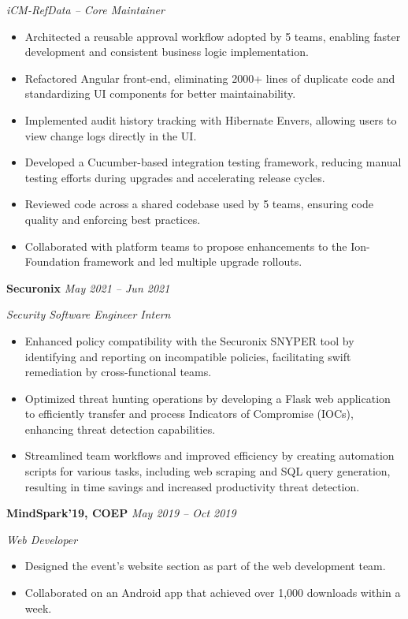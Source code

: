 \documentclass[a4paper,10pt]{article}
\newcommand{\cvHeaderTwo}[2]{%
  \vspace{0.8em}%
  \noindent\textbf{\normalsize #1} \hfill \textit{#2}\par%
}
\newcommand{\cvHeaderThree}[1]{%
  \noindent\textit{#1}%
}
\newenvironment{cvItemList}{%
  \begin{itemize}%
    \setlength{\itemsep}{0.1em}%
    \setlength{\topsep}{0em}%
    \setlength{\partopsep}{0em}%
    \setlength{\parsep}{0em}%
    \setlength{\parskip}{0em}%
}{%
  \end{itemize}%
}
\begin{document}
\cvHeaderThree{iCM-RefData – Core Maintainer}
\begin{cvItemList}
  \item Architected a reusable approval workflow adopted by 5 teams, enabling faster development and consistent business logic implementation.
  \item Refactored Angular front-end, eliminating 2000+ lines of duplicate code and standardizing UI components for better maintainability.
  \item Implemented audit history tracking with Hibernate Envers, allowing users to view change logs directly in the UI.
  \item Developed a Cucumber-based integration testing framework, reducing manual testing efforts during upgrades and accelerating release cycles.
  \item Reviewed code across a shared codebase used by 5 teams, ensuring code quality and enforcing best practices.
  \item Collaborated with platform teams to propose enhancements to the Ion-Foundation framework and led multiple upgrade rollouts.
\end{cvItemList}

\cvHeaderTwo{Securonix}{May 2021 -- Jun 2021}

\cvHeaderThree{Security Software Engineer Intern}
\begin{cvItemList}
\item Enhanced policy compatibility with the Securonix SNYPER tool by identifying and reporting on incompatible policies, facilitating swift remediation by cross-functional teams.
\item Optimized threat hunting operations by developing a Flask web application to efficiently transfer and process Indicators of Compromise (IOCs), enhancing threat detection capabilities.
\item Streamlined team workflows and improved efficiency by creating automation scripts for various tasks, including web scraping and SQL query generation, resulting in time savings and increased productivity threat detection.
\end{cvItemList}

\cvHeaderTwo{MindSpark'19, COEP}{May 2019 -- Oct 2019}

\cvHeaderThree{Web Developer}
\begin{cvItemList}
\item Designed the event’s website section as part of the web development team.
\item Collaborated on an Android app that achieved over 1,000 downloads within a week.
\end{cvItemList}
\end{document}
